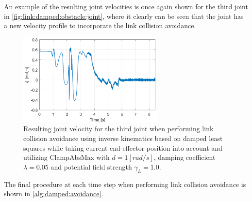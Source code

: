 \documentclass[../main.tex]{subfiles}
\begin{document}
An example of the resulting joint velocities is once again shown for the third joint in \autoref{fig:link:damped:obstacle:joint}, where it clearly can be seen that the joint has a new velocity profile to incorporate the link collision avoidance.
\begin{figure}[H]
    \centering
         \includegraphics[width=0.65\textwidth]{figures/linkcollision/joint_3_vel_obstacle.png}
     \caption{Resulting joint velocity for the third joint when performing link collision avoidance using inverse kinematics based on damped least squares while taking current end-effector position into account and utilizing ClampAbsMax with $d = 1 [rad/s]$, damping coefficient $\lambda = 0.05$ and potential field strength $\gamma_L = 1.0$.}
     \label{fig:link:damped:obstacle:joint}
\end{figure}
The final procedure at each time step when performing link collision avoidance is shown in \autoref{alg:damped:avoidance}.\\
\end{document}
